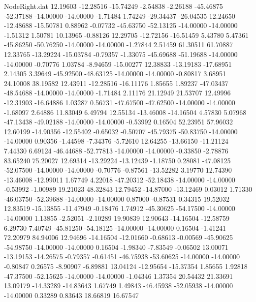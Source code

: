 \begin{filecontents}{NodeRight.dat}
  12.19603  -12.28516  -15.74249    -2.54838   -2.26188  -45.46875  -52.37188  -14.00000  -14.00000   -1.71484    1.74249  -29.34437  -26.04535
  12.24650  -12.48688  -15.50781     0.88962   -0.07732  -45.63750  -52.13125  -14.00000  -14.00000   -1.51312    1.50781   10.13965   -0.88126
  12.29705  -12.72156  -16.51459     5.43780    5.47361  -45.86250  -50.76250  -14.00000  -14.00000   -1.27844    2.51459   61.30511   61.70887
  12.33765  -13.29224  -15.03784    -0.79357   -1.33075  -45.69688  -51.19688  -14.00000  -14.00000   -0.70776    1.03784   -8.94659  -15.00277
  12.38833  -13.19183  -17.68951     2.14305    3.39649  -45.92500  -48.63125  -14.00000  -14.00000   -0.80817    3.68951   24.10008   38.19582
  12.43911  -12.28516  -16.11176     1.85655    1.89237  -47.03437  -48.54688  -14.00000  -14.00000   -1.71484    2.11176   21.12949   21.53707
  12.49996  -12.31903  -16.64886     1.03287    0.56731  -47.67500  -47.62500  -14.00000  -14.00000   -1.68097    2.64886   11.83049    6.49794
  12.55134  -13.46008  -14.16504     4.57830    5.07968  -47.13438  -49.02188  -14.00000  -14.00000   -0.53992    0.16504   52.23951   57.96032
  12.60199  -14.90356  -12.55402    -0.65032   -0.50707  -45.79375  -50.83750  -14.00000  -14.00000    0.90356   -1.44598   -7.34376   -5.72610
  12.64255  -13.66150  -11.21124     7.44330    6.69124  -46.44688  -52.77813  -14.00000  -14.00000   -0.33850   -2.78876   83.65240   75.20027
  12.69314  -13.29224  -13.12439    -1.18750    0.28081  -47.08125  -52.07500  -14.00000  -14.00000   -0.70776   -0.87561  -13.52282    3.19770
  12.74390  -13.46008  -12.99011     1.67749    4.22018  -47.20312  -52.18438  -14.00000  -14.00000   -0.53992   -1.00989   19.21023   48.32843
  12.79452  -14.87000  -13.12469     0.03012    1.71330  -46.03750  -52.39688  -14.00000  -14.00000    0.87000   -0.87531    0.34315   19.52032
  12.83519  -15.13855  -11.47949    -0.18476    1.74912  -45.30625  -54.17500  -14.00000  -14.00000    1.13855   -2.52051   -2.10289   19.90839
  12.90643  -14.16504  -12.58759     6.29730    7.40749  -45.81250  -54.18125  -14.00000  -14.00000    0.16504   -1.41241   72.20979   84.94006
  12.94696  -14.16504  -12.01660    -0.68613   -0.00569  -45.90625  -54.98750  -14.00000  -14.00000    0.16504   -1.98340   -7.83549   -0.06502
  13.00071  -13.19153  -14.26575    -0.79357   -0.61451  -46.75938  -53.60625  -14.00000  -14.00000   -0.80847    0.26575   -8.90907   -6.89881
  13.04124  -12.95654  -15.37354     1.85655    1.92818  -47.37500  -52.15625  -14.00000  -14.00000   -1.04346    1.37354   20.54432   21.33691
  13.09179  -14.33289  -14.83643     1.67749    1.49843  -46.45938  -52.05938  -14.00000  -14.00000    0.33289    0.83643   18.66819   16.67547

\end{filecontents}
